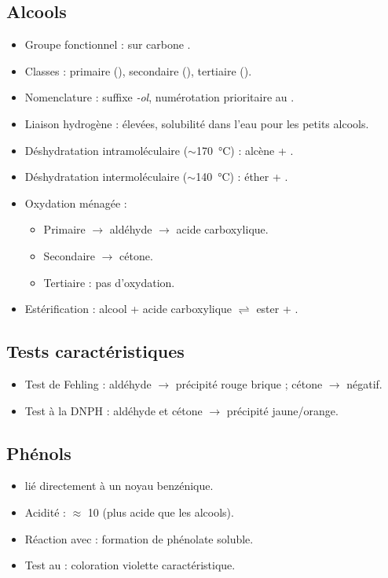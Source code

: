 \begin{synthese}
\subsection*{Alcools}
\begin{itemize}
\item Groupe fonctionnel :  sur carbone .
\item Classes : primaire (), secondaire (), tertiaire ().
\item Nomenclature : suffixe \textit{-ol}, numérotation prioritaire au .
\item Liaison hydrogène :  élevées, solubilité dans l'eau pour les petits alcools.
\item Déshydratation intramoléculaire ($\sim$\SI{170}{\celsius}) : alcène + .
\item Déshydratation intermoléculaire ($\sim$\SI{140}{\celsius}) : éther + .
\item Oxydation ménagée :
\begin{itemize}
\item Primaire $\rightarrow$ aldéhyde $\rightarrow$ acide carboxylique.
\item Secondaire $\rightarrow$ cétone.
\item Tertiaire : pas d'oxydation.
\end{itemize}
\item Estérification : alcool + acide carboxylique $\rightleftharpoons$ ester + .
\end{itemize}

\subsection*{Tests caractéristiques}
\begin{itemize}
\item Test de Fehling : aldéhyde $\rightarrow$ précipité rouge brique  ; cétone $\rightarrow$ négatif.
\item Test à la DNPH : aldéhyde et cétone $\rightarrow$ précipité jaune/orange.
\end{itemize}

\subsection*{Phénols}
\begin{itemize}
\item {} lié directement à un noyau benzénique.
\item Acidité :  $\approx$ \num{10} (plus acide que les alcools).
\item Réaction avec  : formation de phénolate soluble.
\item Test au  : coloration violette caractéristique.
\end{itemize}
\end{synthese}

